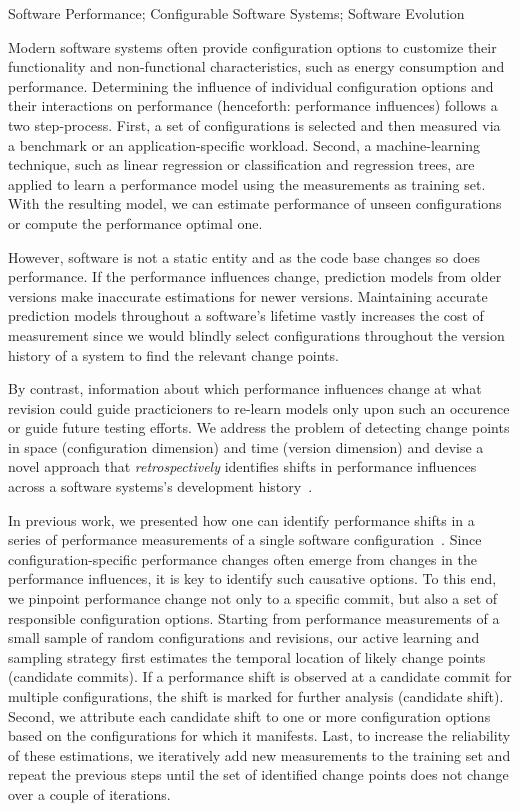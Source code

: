 \documentclass[utf8,biblatex]{lni}
\begin{document}
\begin{keywords}
Software Performance; Configurable Software Systems; Software Evolution
\end{keywords}

Modern software systems often provide configuration options to customize their functionality and non-functional characteristics, such as energy consumption and performance. 
Determining the influence of individual configuration options and their interactions on performance (henceforth: performance influences) follows a two step-process. First, a set of configurations is selected and then measured via a benchmark or an application-specific workload. Second, a machine-learning technique, such as linear regression or classification and regression trees, are applied to learn a performance model using the measurements as training set. With the resulting model, we can estimate performance of unseen configurations or compute the performance optimal one.

However, software is not a static entity and as the code base changes so does performance. If the performance influences change, prediction models from older versions make inaccurate estimations for newer versions. Maintaining accurate prediction models throughout a software's lifetime vastly increases the cost of measurement since we would blindly select configurations throughout the version history of a system to find the relevant change points.

By contrast, information about which performance influences change at what revision could guide practicioners to re-learn models only upon such an occurence or guide future testing efforts. 
We address the problem of detecting change points in space (configuration dimension) and time (version dimension) and devise a novel approach that \textit{retrospectively} identifies shifts in performance influences across a software systems’s development history~\cite{muehlbauer_identifying_2020}. 

In previous work, we presented how one can identify performance shifts in a series of performance measurements of a single software configuration~\cite{muhlbauer_accurate_2019}.
Since configuration-specific performance changes often emerge from changes in the performance influences, it is key to identify such causative options. To this end, we 
pinpoint performance change not only to a specific commit, but also a set of responsible configuration options. 
Starting from performance measurements of a small sample of random configurations and revisions, our active learning and sampling strategy first estimates the temporal location of likely change points (candidate commits). If a performance shift is observed at a candidate commit for multiple configurations, the shift is marked for further analysis (candidate shift). Second, we attribute each candidate shift to one or more configuration options based on the configurations for which it manifests. Last, to increase the reliability of these estimations, we iteratively add new measurements to the training set and repeat the previous steps until the set of identified change points does not change over a couple of iterations.
\end{document}
